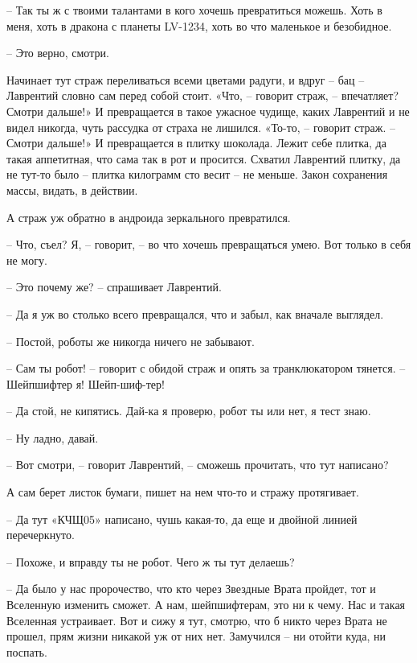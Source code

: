 \documentclass[ebook,oneside,final,openright]{memoir}
\begin{document}
– Так ты ж с твоими талантами в кого хочешь превратиться можешь. Хоть в меня, хоть в дракона с планеты LV-1234, хоть во что маленькое и безобидное. \par
– Это верно, смотри. \par
\par
Начинает тут страж переливаться всеми цветами радуги, и вдруг – бац – Лаврентий словно сам перед собой стоит. «Что, – говорит страж, – впечатляет? Смотри дальше!» И превращается в такое ужасное чудище, каких Лаврентий и не видел никогда, чуть рассудка от страха не лишился. «То-то, – говорит страж. – Смотри дальше!» И превращается в плитку шоколада. Лежит себе плитка, да такая аппетитная, что сама так в рот и просится. Схватил Лаврентий плитку, да не тут-то было – плитка килограмм сто весит – не меньше. Закон сохранения массы, видать, в действии. \par
\par
А страж уж обратно в андроида зеркального превратился. \par
– Что, съел? Я, – говорит, – во что хочешь превращаться умею. Вот только в себя не могу. \par
– Это почему же? – спрашивает Лаврентий.\par
– Да я уж во столько всего превращался, что и забыл, как вначале выглядел. \par
– Постой, роботы же никогда ничего не забывают. \par
– Сам ты робот! – говорит с обидой страж и опять за транклюкатором тянется. – Шейпшифтер я! Шейп-шиф-тер! \par
– Да стой, не кипятись. Дай-ка я проверю, робот ты или нет, я тест знаю. \par
– Ну ладно, давай. \par
– Вот смотри, – говорит Лаврентий, – сможешь прочитать, что тут написано? \par
А сам берет листок бумаги, пишет на нем что-то и стражу протягивает. \par
– Да тут «КЧЩ05» написано, чушь какая-то, да еще и двойной линией перечеркнуто.\par
– Похоже, и вправду ты не робот. Чего ж ты тут делаешь? \par
– Да было у нас пророчество, что кто через Звездные Врата пройдет, тот и Вселенную изменить сможет. А нам, шейпшифтерам, это ни к чему. Нас и такая Вселенная устраивает. Вот и сижу я тут, смотрю, что б никто через Врата не прошел, прям жизни никакой уж от них нет. Замучился – ни отойти куда, ни поспать. \par
\end{document}

